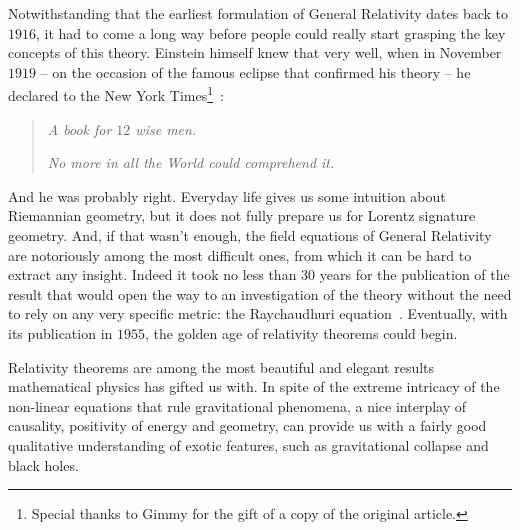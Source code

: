 Notwithstanding that the earliest formulation of General Relativity dates back to \(1916\), it had to come a long way before people could really start grasping the key concepts of this theory. Einstein himself knew that very well, when in November \(1919\) -- on the occasion of the famous eclipse that confirmed his theory -- he declared to the New York Times\footnote{Special thanks to Gimmy for the gift of a copy of the original article.}~\cite{nyt:lights-all-askew}:
\begin{quote}
    \emph{A book for \(12\) wise men. }
    
    \emph{No more in all the World could comprehend it.}
\end{quote}
And he was probably right. Everyday life gives us some intuition about Riemannian geometry, but it does not fully prepare us for Lorentz signature geometry. And, if that wasn't enough, the field equations of General Relativity are notoriously among the most difficult ones, from which it can be hard to extract any insight. Indeed it took no less than \(30\) years for the publication of the result that would open the way to an investigation of the theory without the need to rely on any very specific metric: the Raychaudhuri equation~\cite[]{raychaudhuri1955relativistic}. Eventually, with its publication in \(1955\), the golden age of relativity theorems could begin.

Relativity theorems are among the most beautiful and elegant results mathematical physics has gifted us with. In spite of the extreme intricacy of the non-linear equations that rule gravitational phenomena, a nice interplay of causality, positivity of energy and geometry, can provide us with a fairly good qualitative understanding of exotic features, such as gravitational collapse and black holes.

